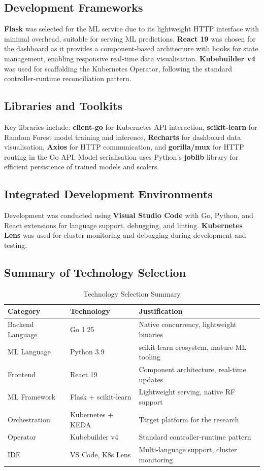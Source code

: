 \subsection{Development Frameworks}
\textbf{Flask} was selected for the ML service due to its lightweight HTTP interface with minimal overhead, suitable for serving ML predictions. \textbf{React 19} was chosen for the dashboard as it provides a component-based architecture with hooks for state management, enabling responsive real-time data visualisation. \textbf{Kubebuilder v4} was used for scaffolding the Kubernetes Operator, following the standard controller-runtime reconciliation pattern.

\subsection{Libraries and Toolkits}
Key libraries include: \textbf{client-go} for Kubernetes API interaction, \textbf{scikit-learn} for Random Forest model training and inference, \textbf{Recharts} for dashboard data visualisation, \textbf{Axios} for HTTP communication, and \textbf{gorilla/mux} for HTTP routing in the Go API. Model serialisation uses Python's \textbf{joblib} library for efficient persistence of trained models and scalers.

\subsection{Integrated Development Environments}
Development was conducted using \textbf{Visual Studio Code} with Go, Python, and React extensions for language support, debugging, and linting. \textbf{Kubernetes Lens} was used for cluster monitoring and debugging during development and testing.

\subsection{Summary of Technology Selection}
\begin{table}[H]
\centering
\begin{tabularx}{\textwidth}{|l|X|X|}
\hline
\textbf{Category} & \textbf{Technology} & \textbf{Justification} \\ \hline
Backend Language & Go 1.25 & Native concurrency, lightweight binaries \\ \hline
ML Language & Python 3.9 & scikit-learn ecosystem, mature ML tooling \\ \hline
Frontend & React 19 & Component architecture, real-time updates \\ \hline
ML Framework & Flask + scikit-learn & Lightweight serving, native RF support \\ \hline
Orchestration & Kubernetes + KEDA & Target platform for the research \\ \hline
Operator & Kubebuilder v4 & Standard controller-runtime pattern \\ \hline
IDE & VS Code, K8s Lens & Multi-language support, cluster monitoring \\ \hline
\end{tabularx}
\caption{Technology Selection Summary}
\label{tab:tech_summary}
\end{table}


